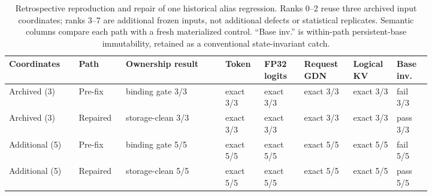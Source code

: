 \begin{table}[H]
\caption{Retrospective reproduction and repair of one historical alias
regression.  Ranks 0--2 reuse three archived input coordinates; ranks 3--7
are additional frozen inputs, not additional defects or statistical
replicates.  Semantic columns compare each path with a fresh materialized
control.  ``Base inv.'' is within-path persistent-base immutability, retained
as a conventional state-invariant catch.}
\label{tab:r35-historical-alias}
\centering\scriptsize
\setlength{\tabcolsep}{2.1pt}
\begin{tabular}{@{}>{\raggedright\arraybackslash}p{0.14\linewidth}>{\raggedright\arraybackslash}p{0.08\linewidth}>{\raggedright\arraybackslash}p{0.20\linewidth}p{0.075\linewidth}p{0.085\linewidth}p{0.09\linewidth}p{0.075\linewidth}p{0.07\linewidth}@{}}
\toprule
Coordinates & Path & Ownership result & Token & FP32 logits & Request GDN & Logical KV & Base inv. \\
\midrule
Archived (3) & Pre-fix & binding gate 3/3 & exact 3/3 & exact 3/3 & exact 3/3 & exact 3/3 & fail 3/3 \\
Archived (3) & Repaired & storage-clean 3/3 & exact 3/3 & exact 3/3 & exact 3/3 & exact 3/3 & pass 3/3 \\
Additional (5) & Pre-fix & binding gate 5/5 & exact 5/5 & exact 5/5 & exact 5/5 & exact 5/5 & fail 5/5 \\
Additional (5) & Repaired & storage-clean 5/5 & exact 5/5 & exact 5/5 & exact 5/5 & exact 5/5 & pass 5/5 \\
\bottomrule
\end{tabular}
\end{table}
